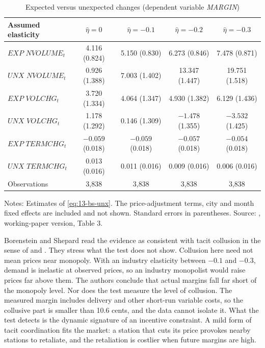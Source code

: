 \begin{table}[htbp]
\centering
\caption{Expected versus unexpected changes (dependent variable \textit{MARGIN})}\label{tab:13-bs-t3}
\small
\begin{tabular}{lcccc}
\toprule
Assumed elasticity & $\hat\eta=0$ & $\hat\eta=-0.1$ & $\hat\eta=-0.2$ & $\hat\eta=-0.3$\\
\midrule
$\textit{EXP NVOLUME}_t$ & 4.116 (0.824) & 5.150 (0.830) & 6.273 (0.846) & 7.478 (0.871)\\
$\textit{UNX NVOLUME}_t$ & 0.926 (1.388) & 7.003 (1.402) & 13.347 (1.447) & 19.751 (1.518)\\
$\textit{EXP VOLCHG}_t$ & 3.720 (1.334) & 4.064 (1.347) & 4.930 (1.382) & 6.129 (1.436)\\
$\textit{UNX VOLCHG}_t$ & 1.178 (1.292) & 0.146 (1.309) & $-1.478$ (1.355) & $-3.532$ (1.425)\\
$\textit{EXP TERMCHG}_t$ & $-0.059$ (0.018) & $-0.059$ (0.018) & $-0.057$ (0.018) & $-0.054$ (0.018)\\
$\textit{UNX TERMCHG}_t$ & 0.013 (0.016) & 0.011 (0.016) & 0.009 (0.016) & 0.006 (0.016)\\
\addlinespace
Observations & 3,838 & 3,838 & 3,838 & 3,838\\
\bottomrule
\end{tabular}

\smallskip
\begin{minipage}{0.92\textwidth}\footnotesize
Notes: Estimates of \eqref{eq:13-bs-unx}. The price-adjustment terms, city and month fixed effects are included
and not shown. Standard errors in parentheses. Source: \citet{BorensteinShepard1996}, working-paper version,
Table 3.
\end{minipage}
\end{table}

Borenstein and Shepard read the evidence as consistent with tacit collusion in the sense of
\citet{RotembergSaloner1986} and \citet{HaltiwangerHarrington1991}. They stress what the test does not show.
Collusion here need not mean prices near monopoly. With an industry elasticity between $-0.1$ and $-0.3$, demand
is inelastic at observed prices, so an industry monopolist would raise prices far above them. The authors conclude
that actual margins fall far short of the monopoly level. Nor does the test measure the level of collusion. The
measured margin includes delivery and other short-run variable costs, so the collusive part is smaller than 10.6
cents, and the data cannot isolate it. What the test detects is the dynamic signature of an incentive constraint.
A mild form of tacit coordination fits the market: a station that cuts
its price provokes nearby stations to retaliate, and the retaliation is costlier when future margins are high.

